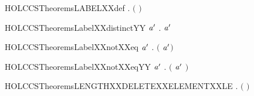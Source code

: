 \newcommand{\HOLCCSTheoremsLabelXXcaseXXeq}{\UseVerbatim{HOLCCSTheoremsLabelXXcaseXXeq}}
\begin{SaveVerbatim}{HOLCCSTheoremsLABELXXdef}
\HOLTokenTurnstile{} \HOLSymConst{\HOLTokenForall{}}.  \ensuremath{(} \ensuremath{)} \HOLSymConst{\ensuremath{=}} 
\end{SaveVerbatim}
\newcommand{\HOLCCSTheoremsLABELXXdef}{\UseVerbatim{HOLCCSTheoremsLABELXXdef}}
\begin{SaveVerbatim}{HOLCCSTheoremsLabelXXdistinctYY}
\HOLTokenTurnstile{} \HOLSymConst{\HOLTokenForall{}}\ensuremath{\HOLBoundVar{a}\sp{\prime}} .  \ensuremath{\HOLBoundVar{a}\sp{\prime}} \HOLSymConst{\HOLTokenNotEqual{}}  
\end{SaveVerbatim}
\newcommand{\HOLCCSTheoremsLabelXXdistinctYY}{\UseVerbatim{HOLCCSTheoremsLabelXXdistinctYY}}
\begin{SaveVerbatim}{HOLCCSTheoremsLabelXXnotXXeq}
\HOLTokenTurnstile{} \HOLSymConst{\HOLTokenForall{}}\ensuremath{\HOLBoundVar{a}\sp{\prime}} . \ensuremath{(}  \HOLSymConst{\ensuremath{=}}  \ensuremath{\HOLBoundVar{a}\sp{\prime}}\ensuremath{)} \HOLSymConst{\HOLTokenEquiv{}} 
\end{SaveVerbatim}
\newcommand{\HOLCCSTheoremsLabelXXnotXXeq}{\UseVerbatim{HOLCCSTheoremsLabelXXnotXXeq}}
\begin{SaveVerbatim}{HOLCCSTheoremsLabelXXnotXXeqYY}
\HOLTokenTurnstile{} \HOLSymConst{\HOLTokenForall{}}\ensuremath{\HOLBoundVar{a}\sp{\prime}} . \ensuremath{(} \ensuremath{\HOLBoundVar{a}\sp{\prime}} \HOLSymConst{\ensuremath{=}}  \ensuremath{)} \HOLSymConst{\HOLTokenEquiv{}} 
\end{SaveVerbatim}
\newcommand{\HOLCCSTheoremsLabelXXnotXXeqYY}{\UseVerbatim{HOLCCSTheoremsLabelXXnotXXeqYY}}
\begin{SaveVerbatim}{HOLCCSTheoremsLENGTHXXDELETEXXELEMENTXXLE}
\HOLTokenTurnstile{} \HOLSymConst{\HOLTokenForall{}} .    \HOLSymConst{\HOLTokenImp{}}  \ensuremath{(}  \ensuremath{)} \HOLSymConst{\HOLTokenLt{}}  
\end{SaveVerbatim}
\newcommand{\HOLCCSTheoremsLENGTHXXDELETEXXELEMENTXXLE}{\UseVerbatim{HOLCCSTheoremsLENGTHXXDELETEXXELEMENTXXLE}}
